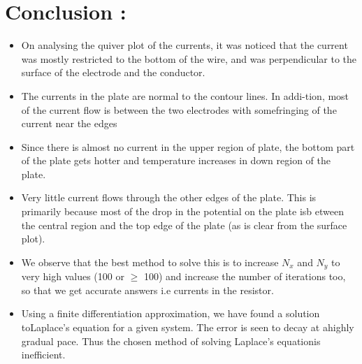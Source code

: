 \documentclass[11pt, a4paper]{article}
\begin{document}
    
  
    
      
  \section{Conclusion :}
  
  \begin{itemize}
  \item
  On analysing the quiver plot of the currents,  it was noticed that the current was mostly restricted to the bottom of the wire, and was perpendicular to the surface of the electrode and the conductor.
  \item
   The  currents  in  the  plate  are  normal  to  the  contour  lines.   In  addi-tion, most of the current flow is between the two electrodes with somefringing of the current near the edges
  \item
    Since there is almost no current in the upper region of plate, the
    bottom part of the plate gets hotter and temperature increases in down
    region of the plate.
  \item
    Very  little  current  flows  through  the  other  edges  of  the  plate.   This is primarily because most of the drop in the potential on the plate isb etween the central region and the top edge of the plate (as is clear from the surface plot).
  \item
    We observe that the best method to solve this is to
    increase \(N_x\) and \(N_y\) to very high values (100 or \(\geq\)
    100) and increase the number of iterations too, so that we get accurate
    answers i.e currents in the resistor.
  \item
  Using  a  finite  differentiation  approximation,  we  have  found  a  solution  toLaplace’s  equation  for  a  given  system.   The  error  is  seen  to  decay  at  ahighly gradual pace.  Thus the chosen method of solving Laplace’s equationis inefficient.
  \end{itemize}
  
\end{document}
